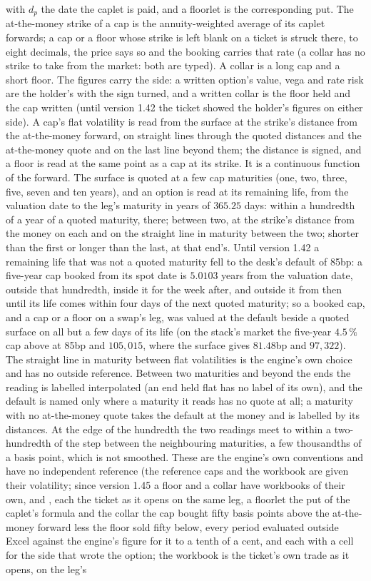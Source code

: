\documentclass[11pt,a4paper]{article}
\newcommand{\code}[1]{\ifmmode\text{\small\texttt{\detokenize{#1}}}\else{\small\path{#1}}\fi}
\begin{document}
with $d_p$ the date the caplet is paid, and a floorlet is the corresponding put. The at-the-money strike of a cap is the annuity-weighted average of its caplet forwards; a cap or a floor whose strike is left blank on a ticket is struck there, to eight decimals, the price says so and the booking carries that rate (a collar has no strike to take from the market: both are typed). A collar is a long cap and a short floor. The figures carry the side: a written option's value, vega and rate risk are the holder's with the sign turned, and a written collar is the floor held and the cap written (until version 1.42 the ticket showed the holder's figures on either side). A cap's flat volatility is read from the surface at the strike's distance from the at-the-money forward, on straight lines through the quoted distances and the at-the-money quote and on the last line beyond them; the distance is signed, and a floor is read at the same point as a cap at its strike. It is a continuous function of the forward. The surface is quoted at a few cap maturities (one, two, three, five, seven and ten years), and an option is read at its remaining life, from the valuation date to the leg's maturity in years of $365.25$ days: within a hundredth of a year of a quoted maturity, there; between two, at the strike's distance from the money on each and on the straight line in maturity between the two; shorter than the first or longer than the last, at that end's. Until version 1.42 a remaining life that was not a quoted maturity fell to the desk's default of 85bp: a five-year cap booked from its spot date is $5.0103$ years from the valuation date, outside that hundredth, inside it for the week after, and outside it from then until its life comes within four days of the next quoted maturity; so a booked cap, and a cap or a floor on a swap's leg, was valued at the default beside a quoted surface on all but a few days of its life (on the stack's market the five-year $4.5\,\%$ cap above at 85bp and $105{,}015$, where the surface gives $81.48$bp and $97{,}322$). The straight line in maturity between flat volatilities is the engine's own choice and has no outside reference. Between two maturities and beyond the ends the reading is labelled interpolated (an end held flat has no label of its own), and the default is named only where a maturity it reads has no quote at all; a maturity with no at-the-money quote takes the default at the money and is labelled by its distances. At the edge of the hundredth the two readings meet to within a two-hundredth of the step between the neighbouring maturities, a few thousandths of a basis point, which is not smoothed. These are the engine's own conventions and have no independent reference (the reference caps and the workbook are given their volatility; since version 1.45 a floor and a collar have workbooks of their own, \code{floor} and \code{collar}, each the ticket as it opens on the same leg, a floorlet the put of the caplet's formula and the collar the cap bought fifty basis points above the at-the-money forward less the floor sold fifty below, every period evaluated outside Excel against the engine's figure for it to a tenth of a cent, and each with a cell for the side that wrote the option; the workbook \code{cap} is the ticket's own trade as it opens, on the leg's 
\end{document}
